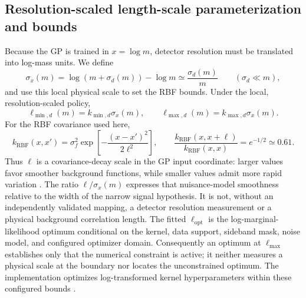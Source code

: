 \subsection{Resolution-scaled length-scale parameterization and bounds}
\label{sec:length-scale}

Because the GP is trained in $x=\log m$, detector resolution must be translated into
log-mass units. We define
\begin{equation}
\sigma_x(m) = \log\!\left(m+\sigma_d(m)\right) - \log m
\simeq \frac{\sigma_d(m)}{m}
\qquad (\sigma_d \ll m),
\end{equation}
and use this local physical scale to set the RBF bounds. Under the local,
resolution-scaled policy,
\begin{equation}
\ell_{\min,d}(m) = k_{\min,d}\sigma_x(m),
\qquad
\ell_{\max,d}(m) = k_{\max,d}\sigma_x(m).
\label{eq:dataset-lengthscale-bounds}
\end{equation}
For the RBF covariance used here,
\begin{equation}
k_{\mathrm{RBF}}(x,x') =
\sigma_f^2\exp\!\left[-\frac{(x-x')^2}{2\ell^2}\right],
\qquad
\frac{k_{\mathrm{RBF}}(x,x+\ell)}{k_{\mathrm{RBF}}(x,x)}
=e^{-1/2}\simeq0.61 .
\label{eq:rbf-lengthscale-interpretation}
\end{equation}
Thus $\ell$ is a covariance-decay scale in the GP input coordinate: larger values
favor smoother background functions, while smaller values admit more rapid
variation \cite{RasmussenWilliams2006,FrateGP2017}. The ratio
$\ell/\sigma_x(m)$ expresses that nuisance-model smoothness relative to the width of
the narrow signal hypothesis. It is not, without an independently validated mapping,
a detector resolution measurement or a physical background correlation length.
The fitted $\ell_{\mathrm{opt}}$ is the log-marginal-likelihood optimum conditional
on the kernel, data support, sideband mask, noise model, and configured optimizer
domain. Consequently an optimum at $\ell_{\max}$ establishes only that the numerical
constraint is active; it neither measures a physical scale at the boundary nor
locates the unconstrained optimum. The implementation optimizes log-transformed
kernel hyperparameters within these configured bounds
\cite{ScikitLearnGPRDocs16}.

